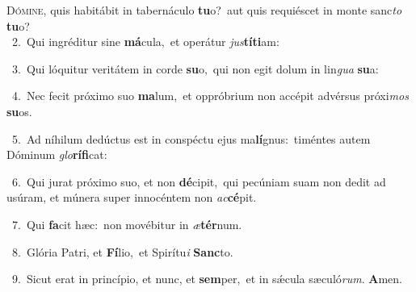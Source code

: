 \lettrine{\initial\textcolor{\initialcolor}{D}}{ómine,} quis habitábit in tabernáculo \textbf{tu}\-o?~\star aut quis requiéscet in monte sanc\textit{to} \textbf{tu}\-o?\\
{\numbfont\textcolor{\numbcolor}{~2.}}~Qui ingréditur sine \textbf{má}\-cula,~\star et operátur \textit{jus}\-\textbf{tí}\textbf{ti}am:\par
{\numbfont\textcolor{\numbcolor}{~3.}}~Qui lóquitur veritátem in corde \textbf{su}\-o,~\star qui non egit dolum in lin\textit{gua} \textbf{su}\-a:\par
{\numbfont\textcolor{\numbcolor}{~4.}}~Nec fecit próximo suo \textbf{ma}\-lum,~\star et oppróbrium non accépit advérsus próxi\textit{mos} \textbf{su}\-os.\par
{\numbfont\textcolor{\numbcolor}{~5.}}~Ad níhilum dedúctus est in conspéctu ejus ma\-\textbf{lí}\-gnus:~\star timéntes autem Dóminum \textit{glo}\-\textbf{rí}\textbf{fi}cat:\par
{\numbfont\textcolor{\numbcolor}{~6.}}~Qui jurat próximo suo, et non \textbf{dé}\-cipit,~\star qui pecúniam suam non dedit ad usúram, et múnera super innocéntem non \textit{ac}\-\textbf{cé}pit.\par
{\numbfont\textcolor{\numbcolor}{~7.}}~Qui \textbf{fa}\-cit hæc:~\star non movébitur in \textit{æ}\-\textbf{tér}num.\par
{\numbfont\textcolor{\numbcolor}{~8.}}~Glória Patri, et \textbf{Fí}\-lio,~\star et Spirítu\textit{i} \textbf{Sanc}\-to.\par
{\numbfont\textcolor{\numbcolor}{~9.}}~Sicut erat in princípio, et nunc, et \textbf{sem}\-per,~\star et in sǽcula sæculó\-\textit{rum}\-. \textbf{A}\-men.\par
